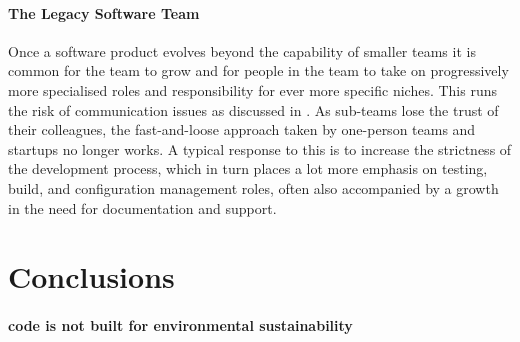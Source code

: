 \paragraph{The Legacy Software Team}
Once a software product evolves beyond the capability of smaller teams it is common for the team to grow and for people in the team to take on progressively more specialised roles and responsibility for ever more specific niches. This runs the risk of communication issues as discussed in \cite{Brooks1995}. As sub-teams lose the trust of their colleagues, the fast-and-loose approach taken by one-person teams and startups no longer works. A typical response to this is to increase the strictness of the development process, which in turn places a lot more emphasis on testing, build, and configuration management roles, often also accompanied by a growth in the need for documentation and support.

\section{Conclusions}
\label{section:development conclusions}

\paragraph{code is not built for environmental sustainability}
